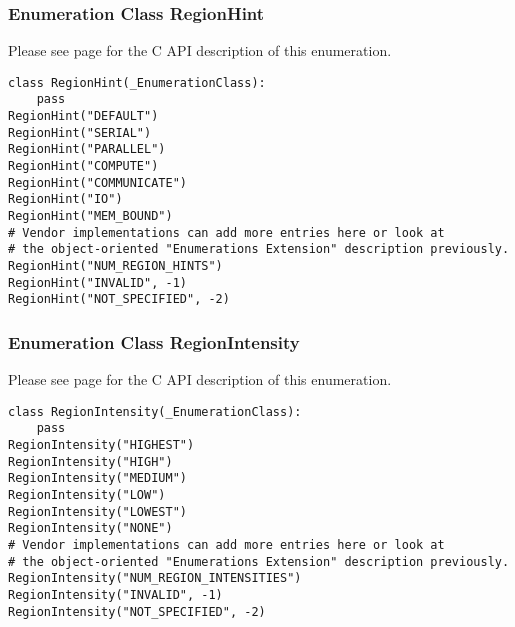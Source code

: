 \documentclass[12pt]{report} %
\begin{document}
\begin{appendices}
\subsubsection{Enumeration Class RegionHint}\label{class:RegionHint}

Please see page \pageref{type:RegionHint} for the C API description of this
enumeration.

\begin{center}\begin{minipage}{.95\linewidth}\begin{lstlisting}
class RegionHint(_EnumerationClass):
    pass
RegionHint("DEFAULT")
RegionHint("SERIAL")
RegionHint("PARALLEL")
RegionHint("COMPUTE")
RegionHint("COMMUNICATE")
RegionHint("IO")
RegionHint("MEM_BOUND")
# Vendor implementations can add more entries here or look at  
# the object-oriented "Enumerations Extension" description previously. 
RegionHint("NUM_REGION_HINTS")
RegionHint("INVALID", -1)
RegionHint("NOT_SPECIFIED", -2)
\end{lstlisting}\end{minipage}\end{center}

\subsubsection{Enumeration Class RegionIntensity}\label{class:RegionIntensity}

Please see page \pageref{type:RegionIntensity} for the C API description of this
enumeration.

\begin{center}\begin{minipage}{.95\linewidth}\begin{lstlisting}
class RegionIntensity(_EnumerationClass):
    pass
RegionIntensity("HIGHEST")
RegionIntensity("HIGH")
RegionIntensity("MEDIUM")
RegionIntensity("LOW")
RegionIntensity("LOWEST")
RegionIntensity("NONE")
# Vendor implementations can add more entries here or look at  
# the object-oriented "Enumerations Extension" description previously. 
RegionIntensity("NUM_REGION_INTENSITIES")
RegionIntensity("INVALID", -1)
RegionIntensity("NOT_SPECIFIED", -2)
\end{lstlisting}\end{minipage}\end{center}


\end{appendices}
\end{document}
